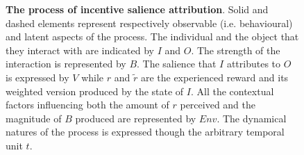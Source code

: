 \begin{figure}[h]
\begin{center}
\begin{adjustbox}{width=0.5\columnwidth}
    \end{adjustbox}
  \end{center}
\caption{\textbf{The process of incentive salience attribution}. Solid and dashed elements represent respectively observable (i.e. behavioural) and latent aspects of the process. The individual and the object that they interact with are indicated by $I$ and $O$. The strength of the interaction is represented by $B$. The salience that $I$ attributes to $O$ is expressed by $V$ while $r$ and $\tilde{r}$ are the experienced reward and its weighted version produced by the state of $I$. All the contextual factors influencing both the amount of $r$ perceived and the magnitude of $B$ produced are represented by $Env$. The dynamical natures of the process is expressed though the arbitrary temporal unit $t$.}
\label{fig: incs}
\end{figure}